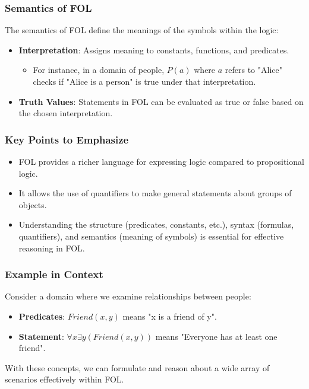 \documentclass[aspectratio=169]{beamer}
\begin{document}
\begin{frame}[fragile]
    \frametitle{Semantics of FOL}
    The semantics of FOL define the meanings of the symbols within the logic:
    \begin{itemize}
        \item \textbf{Interpretation}: Assigns meaning to constants, functions, and predicates. 
        \begin{itemize}
            \item For instance, in a domain of people, \( P(a) \) where \( a \) refers to "Alice" checks if "Alice is a person" is true under that interpretation.
        \end{itemize}
        
        \item \textbf{Truth Values}: Statements in FOL can be evaluated as true or false based on the chosen interpretation.
    \end{itemize}
\end{frame}

\begin{frame}[fragile]
    \frametitle{Key Points to Emphasize}
    \begin{itemize}
        \item FOL provides a richer language for expressing logic compared to propositional logic.
        \item It allows the use of quantifiers to make general statements about groups of objects.
        \item Understanding the structure (predicates, constants, etc.), syntax (formulas, quantifiers), and semantics (meaning of symbols) is essential for effective reasoning in FOL.
    \end{itemize}
\end{frame}

\begin{frame}[fragile]
    \frametitle{Example in Context}
    Consider a domain where we examine relationships between people:
    \begin{itemize}
        \item \textbf{Predicates}: \( Friend(x, y) \) means "x is a friend of y".
        \item \textbf{Statement}: \( \forall x \exists y (Friend(x, y)) \) means "Everyone has at least one friend".
    \end{itemize}
    
    With these concepts, we can formulate and reason about a wide array of scenarios effectively within FOL.
\end{frame}
\end{document}
